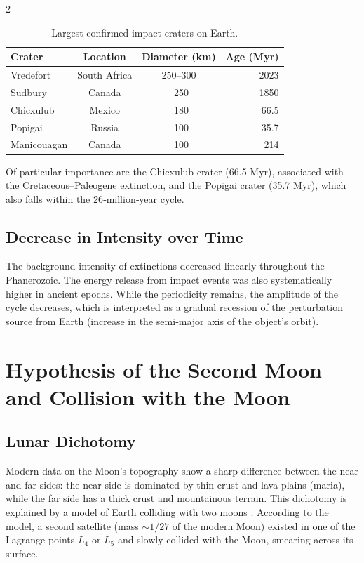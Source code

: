 \documentclass[11pt,a4paper]{article}
\begin{document}
\begin{multicols}{2}
		\begin{table}[htbp]
			\centering
			\caption{Largest confirmed impact craters on Earth.}
			\label{tab:craters}
			\footnotesize
			\begin{tabular}{lccr}
				\toprule
				\textbf{Crater} & \textbf{Location} & \textbf{Diameter (km)} & \textbf{Age (Myr)} \\
				\midrule
				Vredefort & South Africa & 250–300 & 2023 \\
				Sudbury & Canada & ~250 & 1850 \\
				Chicxulub & Mexico & ~180 & 66.5 \\
				Popigai & Russia & ~100 & 35.7 \\
				Manicouagan & Canada & ~100 & 214 \\
				\bottomrule
			\end{tabular}
		\end{table}
		
		Of particular importance are the Chicxulub crater (66.5 Myr), associated with the Cretaceous–Paleogene extinction, and the Popigai crater (35.7 Myr), which also falls within the 26‑million‑year cycle.
		
		\subsection{Decrease in Intensity over Time}
		
		The background intensity of extinctions decreased linearly throughout the Phanerozoic. The energy release from impact events was also systematically higher in ancient epochs. While the periodicity remains, the amplitude of the cycle decreases, which is interpreted as a gradual recession of the perturbation source from Earth (increase in the semi‑major axis of the object's orbit).
		
		\section{Hypothesis of the Second Moon and Collision with the Moon}
		
		\subsection{Lunar Dichotomy}
		
		Modern data on the Moon's topography show a sharp difference between the near and far sides: the near side is dominated by thin crust and lava plains (maria), while the far side has a thick crust and mountainous terrain. This dichotomy is explained by a model of Earth colliding with two moons \cite{JutziAsphaug2011}. According to the model, a second satellite (mass \(\sim 1/27\) of the modern Moon) existed in one of the Lagrange points \(L_4\) or \(L_5\) and slowly collided with the Moon, smearing across its surface.
		

\end{multicols}
\end{document}

